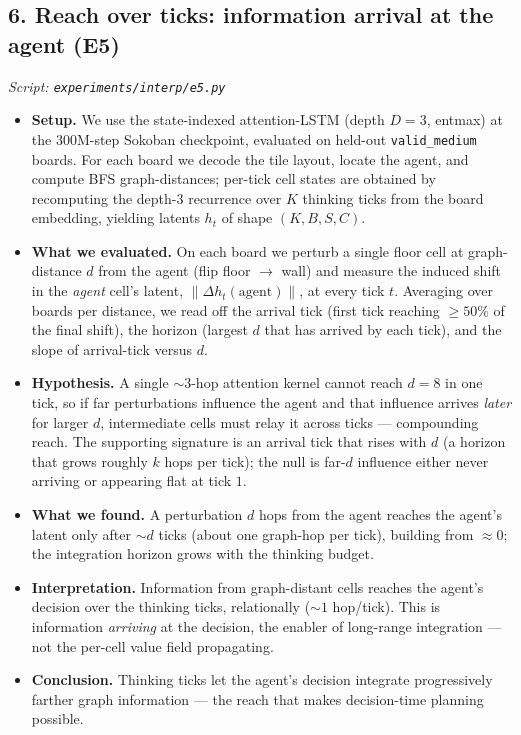 \documentclass[11pt]{article}
\begin{document}
\subsection*{6. Reach over ticks: information arrival at the agent (E5)}
\textit{Script: \texttt{experiments/interp/e5.py}}
\begin{itemize}
\item \textbf{Setup.} We use the state-indexed attention-LSTM (depth $D=3$, entmax) at the 300M-step Sokoban checkpoint, evaluated on held-out \texttt{valid\_medium} boards. For each board we decode the tile layout, locate the agent, and compute BFS graph-distances; per-tick cell states are obtained by recomputing the depth-$3$ recurrence over $K$ thinking ticks from the board embedding, yielding latents $h_t$ of shape $(K,B,S,C)$.
\item \textbf{What we evaluated.} On each board we perturb a single floor cell at graph-distance $d$ from the agent (flip floor $\to$ wall) and measure the induced shift in the \emph{agent} cell's latent, $\lVert \Delta h_t(\text{agent}) \rVert$, at every tick $t$. Averaging over boards per distance, we read off the arrival tick (first tick reaching $\geq 50\%$ of the final shift), the horizon (largest $d$ that has arrived by each tick), and the slope of arrival-tick versus $d$.
\item \textbf{Hypothesis.} A single $\sim 3$-hop attention kernel cannot reach $d=8$ in one tick, so if far perturbations influence the agent and that influence arrives \emph{later} for larger $d$, intermediate cells must relay it across ticks --- compounding reach. The supporting signature is an arrival tick that rises with $d$ (a horizon that grows roughly $k$ hops per tick); the null is far-$d$ influence either never arriving or appearing flat at tick $1$.
\item \textbf{What we found.} A perturbation $d$ hops from the agent reaches the agent's latent only after $\sim d$ ticks (about one graph-hop per tick), building from $\approx 0$; the integration horizon grows with the thinking budget.
\item \textbf{Interpretation.} Information from graph-distant cells reaches the agent's decision over the thinking ticks, relationally ($\sim 1$ hop/tick). This is information \emph{arriving} at the decision, the enabler of long-range integration --- not the per-cell value field propagating.
\item \textbf{Conclusion.} Thinking ticks let the agent's decision integrate progressively farther graph information --- the reach that makes decision-time planning possible.
\end{itemize}
\clearpage
\end{document}
